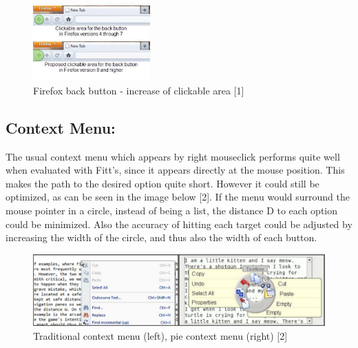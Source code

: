 \documentclass[a4paper,twoside,10pt]{article}
\begin{document}
\begin{figure}[ht]
	\centering
		\includegraphics[width=0.40\textwidth]{firefox.pdf}
	\caption{Firefox back button - increase of clickable area [1]}
	\label{fig:firefox}
\end{figure}

\subsection*{Context Menu:} The usual context menu which appears by right mouseclick performs quite well when evaluated with Fitt's, since it appears directly at the mouse position. This makes the path to the desired option quite short. However it could still be optimized, as can be seen in the image below [2]. If the menu would surround the mouse pointer in a circle, instead of being a list, the distance D to each option could be minimized. Also the accuracy of hitting each target could be adjusted by increasing the width of the circle, and thus also the width of each button.

\begin{figure}[ht]
		\includegraphics[width=1.00\textwidth]{context_menu.pdf}
	\caption{Traditional context menu (left), pie context menu (right) [2]}
	\label{fig:context_menu}
\end{figure}
\end{document}
